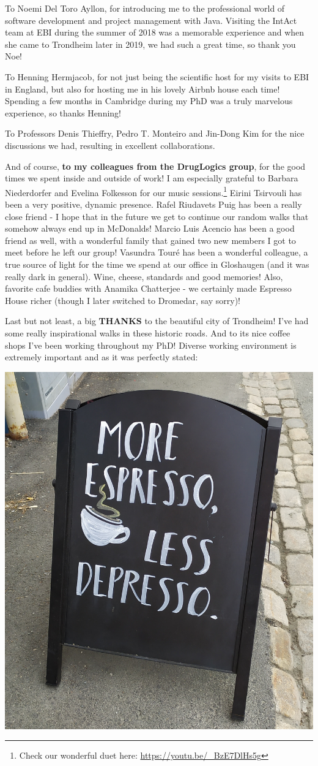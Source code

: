 \documentclass[
  12pt,
]{book}
\begin{document}
To Noemi Del Toro Ayllon, for introducing me to the professional world of software development and project management with Java. Visiting the IntAct team at EBI during the summer of 2018 was a memorable experience and when she came to Trondheim later in 2019, we had such a great time, so thank you Noe!

\newpage

To Henning Hermjacob, for not just being the scientific host for my visits to EBI in England, but also for hosting me in his lovely Airbnb house each time! Spending a few months in Cambridge during my PhD was a truly marvelous experience, so thanks Henning!

To Professors Denis Thieffry, Pedro T. Monteiro and Jin-Dong Kim for the nice discussions we had, resulting in excellent collaborations.

And of course, \textbf{to my colleagues from the DrugLogics group}, for the good times we spent inside and outside of work! I am especially grateful to Barbara Niederdorfer and Evelina Folkesson for our music sessions.\footnote{Check our wonderful duet here: \url{https://youtu.be/_BzE7DlHs5g}} Eirini Tsirvouli has been a very positive, dynamic presence. Rafel Riudavets Puig has been a really close friend - I hope that in the future we get to continue our random walks that somehow always end up in McDonalds! Marcio Luis Acencio has been a good friend as well, with a wonderful family that gained two new members I got to meet before he left our group! Vasundra Touré has been a wonderful colleague, a true source of light for the time we spend at our office in Gloshaugen (and it was really dark in general). Wine, cheese, standards and good memories! Also, favorite cafe buddies with Anamika Chatterjee - we certainly made Espresso House richer (though I later switched to Dromedar, say sorry)!

Last but not least, a big \textbf{THANKS} to the beautiful city of Trondheim! I've had some really inspirational walks in these historic roads. And to its nice coffee shops I've been working throughout my PhD! Diverse working environment is extremely important and as it was perfectly stated:

\begin{center}\includegraphics[width=0.4\linewidth]{img/depresso} \end{center}
\end{document}
